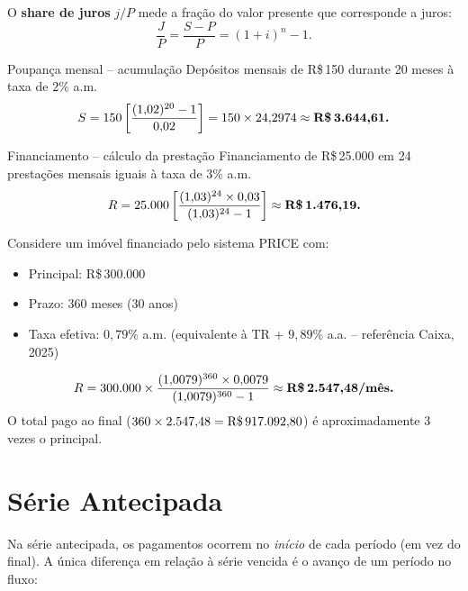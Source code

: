 O \textbf{share de juros} $j/P$ mede a fração do valor presente que corresponde a juros:
\[
  \frac{J}{P} = \frac{S - P}{P} = (1+i)^n - 1.
\]

\begin{exemplo}{Poupança mensal -- acumulação}
\label{ex:poupança}
Depósitos mensais de R\$\,150 durante 20 meses à taxa de $2\%$ a.m.
\[
  S = 150\left[\frac{(1{,}02)^{20}-1}{0{,}02}\right]
    = 150 \times 24{,}2974 \approx \textbf{R\$\,3.644{,}61.}
\]
\end{exemplo}

\begin{exemplo}{Financiamento -- cálculo da prestação}
\label{ex:financiamento}
Financiamento de R\$\,25.000 em 24 prestações mensais iguais à taxa de $3\%$ a.m.
\[
  R = 25{.}000\left[\frac{(1{,}03)^{24} \times 0{,}03}{(1{,}03)^{24}-1}\right]
    \approx \textbf{R\$\,1.476{,}19.}
\]
\end{exemplo}

\begin{moderno}[title={Financiamento imobiliário em 2025}]
Considere um imóvel financiado pelo sistema PRICE com:
\begin{itemize}[leftmargin=1.8em, nosep]
  \item Principal: R\$\,300.000
  \item Prazo: 360 meses (30 anos)
  \item Taxa efetiva: $0{,}79\%$ a.m. (equivalente à TR + $9{,}89\%$ a.a. -- referência Caixa, 2025)
\end{itemize}
\[
  R = 300{.}000 \times \frac{(1{,}0079)^{360}\times 0{,}0079}{(1{,}0079)^{360}-1}
    \approx \textbf{R\$\,2.547{,}48/mês.}
\]
O total pago ao final ($360 \times 2.547{,}48 = \text{R\$\,}917.092{,}80$) é aproximadamente
3 vezes o principal.
\end{moderno}

\section{Série Antecipada}

Na série antecipada, os pagamentos ocorrem no \emph{início} de cada período (em vez do final). A única diferença em relação à série vencida é o avanço de um período no fluxo:

\begin{center}
\end{center}

